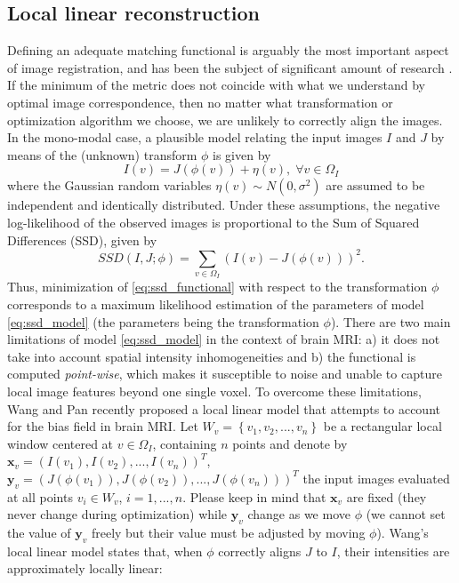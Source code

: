 \subsection{Local linear reconstruction}
Defining an adequate matching functional is arguably the most important aspect of image registration, and has been the subject of significant amount of research \citep{Sotiras2013}. If the minimum of the metric does not coincide with what we understand by optimal image correspondence, then no matter what transformation or optimization algorithm we choose, we are unlikely to correctly align the images. In the mono-modal case, a plausible model relating the input images $I$ and $J$ by means of the (unknown) transform $\phi$ is given by
\begin{equation}\label{eq:ssd_model}
    I(v) = J(\phi(v)) + \eta(v), \; \forall v\in\Omega_{I}
\end{equation}
where the Gaussian random variables $\eta(v) \sim N(0, \sigma^{2})$ are assumed to be independent and identically distributed. Under these assumptions, the negative log-likelihood of the observed images is proportional to the Sum of Squared Differences (SSD), given by
\begin{equation}\label{eq:ssd_functional}
    SSD(I, J; \phi) = \sum_{v \in \Omega_{I}} \left(I(v) - J(\phi(v))\right)^{2}.
\end{equation}
Thus, minimization of \eqref{eq:ssd_functional} with respect to the transformation $\phi$ corresponds to a maximum likelihood estimation of the parameters of model \eqref{eq:ssd_model} (the parameters being the transformation $\phi$). There are two main limitations of model \eqref{eq:ssd_model} in the context of brain MRI: a) it does not take into account spatial intensity inhomogeneities and b) the functional is computed \emph{point-wise}, which makes it susceptible to noise and unable to capture local image features beyond one single voxel. To overcome these limitations, Wang and Pan \cite{Wang2014} recently proposed a local linear model that attempts to account for the bias field in brain MRI. Let $W_{v} = \left\lbrace v_{1}, v_{2}, ..., v_{n} \right\rbrace$ be a rectangular local window centered at $v\in\Omega_{I}$, containing $n$ points and denote by $\mathbf{x}_{v} = (I(v_{1}), I(v_{2}), ..., I(v_{n}))^{T}$, $\mathbf{y}_{v} = (J(\phi(v_{1})), J(\phi(v_{2})), ..., J(\phi(v_{n})))^{T}$ the input images evaluated at all points $v_{i}\in W_{v}$, $i=1, ..., n$. Please keep in mind that $\mathbf{x}_{v}$ are fixed (they never change during optimization) while $\mathbf{y}_{v}$ change as we move $\phi$ (we cannot set the value of $\mathbf{y}_{v}$ freely but their value must be adjusted by moving $\phi$). Wang's local linear model states that, when $\phi$ correctly aligns $J$ to $I$, their intensities are approximately locally linear:
